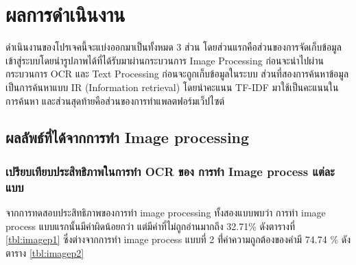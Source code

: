 \chapter{ผลการดำเนินงาน}

ดำเนินงานของโปรเจคนี้จะแบ่งออกมาเป็นทั้งหมด 3 ส่วน โดยส่วนแรกคือส่วนของการจัดเก็บข้อมูลเข้าสู่ระบบโดยนำรูปภาพได้ที่ได้รับมาผ่านกระบวนการ Image Processing ก่อนจะนำไปผ่านกระบวนการ OCR และ Text Processing ก่อนจะถูกเก็บข้อมูลในระบบ ส่วนที่สองการค้นหาข้อมูล เป็นการค้นหาแบบ IR (Information retrieval) โดยนำคะแนน TF-IDF มาใช้เป็นคะแนนในการค้นหา และส่วนสุดท้ายคือส่วนของการทำแพลตฟอร์มเว็ปไซต์

\section{ผลลัพธ์ที่ได้จากการทำ Image processing}

\subsection{เปรียบเทียบประสิทธิภาพในการทำ OCR ของ การทำ Image process แต่ละแบบ}

จากการทดสอบประสิทธิภาพของการทำ image processing ทั้งสองแบบพบว่า การทำ image process แบบแรกนั้นมีคำผิดน้อยกว่า แต่มีคำที่ไม่ถูกอ่านมากถึง 32.71\% ดังตารางที่ \ref{tbl:imagep1} ซึ่งต่างจากการทำ image process แบบที่ 2 ที่่ค่าความถูกต้องของคำมี 74.74 \% ดังตาราง \ref{tbl:imagep2}

